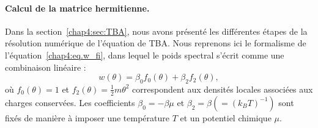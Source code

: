 %
%
%







\paragraph{Calcul de la matrice hermitienne.}

Dans la section~\ref{chap4:sec:TBA}, nous avons présenté les différentes étapes de la résolution numérique de l’équation de \gls*{TBA}.
Nous reprenons ici le formalisme de l’équation~\eqref{chap4:eq.w_fi}, dans lequel le poids spectral s’écrit comme une combinaison linéaire :
\begin{equation}\label{chap4:eq.w.1}
	w(\theta) = \beta_0 f_0(\theta) + \beta_2 f_2(\theta),
\end{equation}
où $f_0(\theta) = 1$ et $f_2(\theta) = \tfrac{1}{2} m \theta^2$ correspondent aux densités locales associées aux charges conservées.
Les coefficients $\beta_0 = - \beta \mu $ et $\beta_2 = \beta (= (k_B T)^{-1})$ sont fixés de manière à imposer une température $T$ et un potentiel chimique $\mu$.

